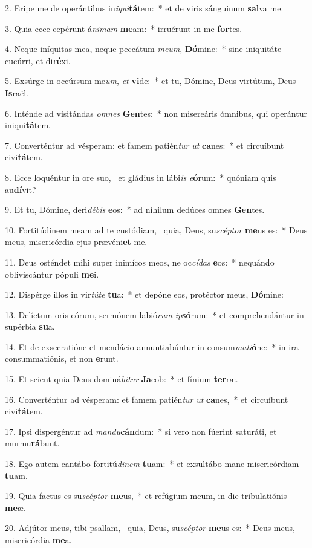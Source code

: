 2. Eripe me de operántibus in\textit{i}\textit{qui}\textbf{tá}tem:~*  et de viris sánguinum \textbf{sal}va me.\

3. Quia ecce cepérunt á\textit{ni}\textit{mam} \textbf{me}am:~*  irruérunt in me \textbf{for}tes.\

4. Neque iníquitas mea, neque peccátum \textit{me}\textit{um}, \textbf{Dó}mine:~*  sine iniquitáte cucúrri, et di\textbf{ré}xi.\

5. Exsúrge in occúrsum me\textit{um}, \textit{et} \textbf{vi}de:~*  et tu, Dómine, Deus virtútum, Deus \textbf{Is}raël.\

6. Inténde ad visitándas \textit{om}\textit{nes} \textbf{Gen}tes:~*  non misereáris ómnibus, qui operántur iniqui\textbf{tá}tem.\

7. Converténtur ad vésperam: et famem patién\textit{tur} \textit{ut} \textbf{ca}nes:~*  et circuíbunt civi\textbf{tá}tem.\

8. Ecce loquéntur in ore suo, \dag\  et gládius in lábi\textit{is} \textit{e}\textbf{ó}rum:~*  quóniam quis au\textbf{dí}vit?\

9. Et tu, Dómine, deri\textit{dé}\textit{bis} \textbf{e}os:~*  ad níhilum dedúces omnes \textbf{Gen}tes.\

10. Fortitúdinem meam ad te custódiam, \dag\  quia, Deus, su\textit{scép}\textit{tor} \textbf{me}us es:~*  Deus meus, misericórdia ejus prævéni\textbf{et} me.\

11. Deus osténdet mihi super inimícos meos, ne oc\textit{cí}\textit{das} \textbf{e}os:~*  nequándo obliviscántur pópuli \textbf{me}i.\

12. Dispérge illos in vir\textit{tú}\textit{te} \textbf{tu}a:~*  et depóne eos, protéctor meus, \textbf{Dó}mine:\

13. Delíctum oris eórum, sermónem labió\textit{rum} \textit{ip}\textbf{só}rum:~*  et comprehendántur in supérbia \textbf{su}a.\

14. Et de exsecratióne et mendácio annuntiabúntur in consum\textit{ma}\textit{ti}\textbf{ó}ne:~*  in ira consummatiónis, et non \textbf{e}runt.\

15. Et scient quia Deus dominá\textit{bi}\textit{tur} \textbf{Ja}cob:~*  et fínium \textbf{ter}ræ.\

16. Converténtur ad vésperam: et famem patién\textit{tur} \textit{ut} \textbf{ca}nes,~*  et circuíbunt civi\textbf{tá}tem.\

17. Ipsi dispergéntur ad \textit{man}\textit{du}\textbf{cán}dum:~*  si vero non fúerint saturáti, et murmu\textbf{rá}bunt.\

18. Ego autem cantábo fortitú\textit{di}\textit{nem} \textbf{tu}am:~*  et exsultábo mane misericórdiam \textbf{tu}am.\

19. Quia factus es su\textit{scép}\textit{tor} \textbf{me}us,~*  et refúgium meum, in die tribulatiónis \textbf{me}æ.\

20. Adjútor meus, tibi psallam, \dag\  quia, Deus, su\textit{scép}\textit{tor} \textbf{me}us es:~*  Deus meus, misericórdia \textbf{me}a.\

